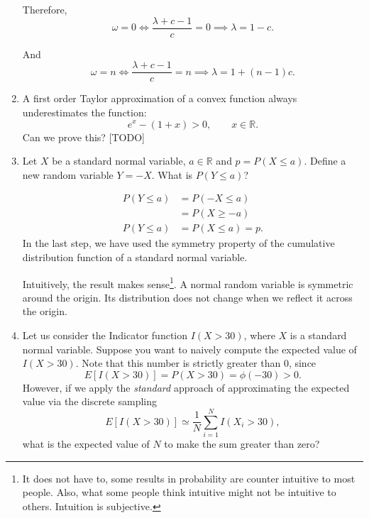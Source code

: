 \documentclass{amsart}
\theoremstyle{plain}
\numberwithin{equation}{section}
\begin{document}
\begin{enumerate}
Therefore, 
\begin{equation}
\omega = 0 \iff
\frac{\lambda + c - 1}{c} = 0
\implies \lambda = 1 - c.
\end{equation}

And
\begin{equation}
\omega = n \iff
\frac{\lambda + c - 1}{c} = n
\implies \lambda = 1 + (n-1)c.
\end{equation}


\item A first order Taylor approximation of a 
convex function always underestimates the
function:
\begin{equation}
e^{x} - ( 1 + x ) > 0, \qquad  x \in \mathbb{R}.
\end{equation}
Can we prove this? [TODO]

\item Let $X$ be a standard normal variable,
$a \in \mathbb{R}$ and $p = P( X \leq a )$.
Define a new random variable $Y = -X$. What is 
$P( Y \leq a )$?

\begin{align}
P( Y \leq a ) &= P( -X \leq a )\\
&= P( X \geq -a )\\
P( Y \leq a ) &= P( X \leq a ) = p.
\end{align}
In the last step, we have used the symmetry property of 
the cumulative distribution function of a standard normal 
variable. 

Intuitively, the result makes sense\footnote{It does not have to,
some results in probability are counter intuitive to most people. 
Also, what some people think intuitive might not be intuitive to 
others. Intuition is subjective.}. A normal 
random variable is symmetric around the origin. Its 
distribution does not change when we reflect it across the origin.

\item Let us consider the Indicator function $I(X>30)$, where
$X$ is a standard normal variable. 
Suppose you want to naively compute the expected value of 
$I(X>30)$. Note that this number is strictly greater than
$0$, since
\begin{equation*}
E[I(X>30)] = P(X>30) = \phi( -30 ) > 0.
\end{equation*}
However, if we apply the \emph{standard} approach 
of approximating the expected value via the 
discrete sampling
\begin{equation*}
E[I(X>30)] \simeq \frac{1}{N}\sum_{i=1}^{N} I(X_i>30), 
\end{equation*}
what is the expected value of $N$ to make the 
sum greater than zero?


\end{enumerate}
\end{document}
